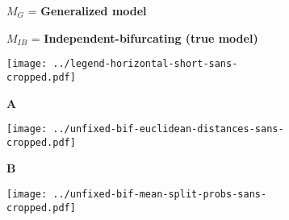 \documentclass[border=10pt,varwidth=30cm]{standalone}
\begin{document}
\begin{figure}
    \centering
    \begin{subfigure}[c][][c]{0.39\textwidth}
        \centering
        \huge {\Huge $M_{G}$} = \textbf{Generalized model}
    \end{subfigure}
    \hfill
    \begin{subfigure}[c][][c]{0.59\textwidth}
        \centering
        \huge {\Huge $M_{IB}$} = \textbf{Independent-bifurcating (true model)}
    \end{subfigure}
    \vspace{2mm}
    \begin{subfigure}[c][][c]{\textwidth}
        \centering
        \texttt{[image: ../legend-horizontal-short-sans-cropped.pdf]}
    \end{subfigure}
    \vspace{2mm}
    \begin{subfigure}[b][][l]{\textwidth}
        \Huge \textbf{A}
    \end{subfigure}
    \begin{subfigure}[c][][c]{\textwidth}
        \centering
        \texttt{[image: ../unfixed-bif-euclidean-distances-sans-cropped.pdf]}
    \end{subfigure}
    \begin{subfigure}[b][][l]{\textwidth}
        \Huge \textbf{B}
    \end{subfigure}
    \begin{subfigure}[c][][c]{\textwidth}
        \centering
        \texttt{[image: ../unfixed-bif-mean-split-probs-sans-cropped.pdf]}
    \end{subfigure}
\end{figure}
\end{document}

